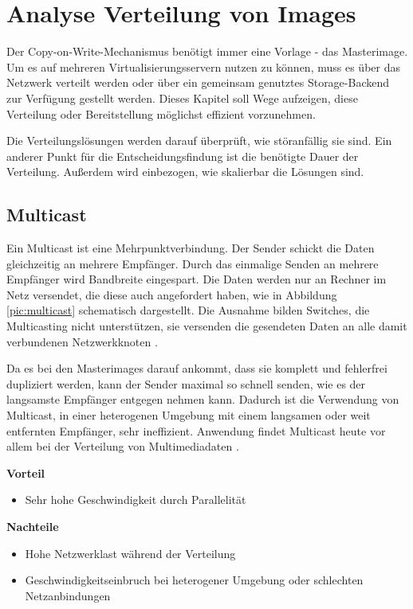 \chapter{Analyse Verteilung von Images}\label{verteilung}
Der Copy-on-Write-Mechanismus benötigt immer eine Vorlage - das Masterimage. Um es auf mehreren Virtualisierungsservern nutzen zu können, muss es über das Netzwerk verteilt werden oder über ein gemeinsam genutztes Storage-Backend zur Verfügung gestellt werden. Dieses Kapitel soll Wege aufzeigen, diese Verteilung oder Bereitstellung möglichst effizient vorzunehmen.

Die Verteilungslösungen werden darauf überprüft, wie störanfällig sie sind. Ein anderer Punkt für die Entscheidungsfindung ist die benötigte Dauer der Verteilung. Außerdem wird einbezogen, wie skalierbar die Lösungen sind.

\section{Multicast}
Ein Multicast ist eine Mehrpunktverbindung. Der Sender schickt die Daten gleichzeitig an mehrere Empfänger. Durch das einmalige Senden an mehrere Empfänger wird Bandbreite eingespart. Die Daten werden nur an Rechner im Netz versendet, die diese auch angefordert haben, wie in Abbildung \ref{pic:multicast} schematisch dargestellt. Die Ausnahme bilden Switches, die Multicasting nicht unterstützen, sie versenden die gesendeten Daten an alle damit verbundenen Netzwerkknoten \cite{Multicasttech}. 

Da es bei den Masterimages darauf ankommt, dass sie komplett und fehlerfrei dupliziert werden, kann der Sender maximal so schnell senden, wie es der langsamste Empfänger entgegen nehmen kann.  Dadurch ist die Verwendung von Multicast, in einer heterogenen Umgebung mit einem langsamen oder weit entfernten Empfänger, sehr ineffizient. Anwendung findet Multicast heute vor allem bei der Verteilung von Multimediadaten \cite{multicastfefe}. 


\textbf{Vorteil}
\begin{itemize}
 \item Sehr hohe Geschwindigkeit durch Parallelität
\end{itemize}

\textbf{Nachteile}
\begin{itemize}
 \item Hohe Netzwerklast während der Verteilung
 \item Geschwindigkeitseinbruch bei heterogener Umgebung oder schlechten Netzanbindungen
\end{itemize}

